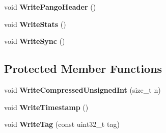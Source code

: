 \begin{DoxyCompactItemize}
\item 
void {\bfseries Write\+Pango\+Header} ()\hypertarget{classpangolin_1_1_packet_stream_writer_a98769a090eb605689cc88e6a5c3052c2}{}\label{classpangolin_1_1_packet_stream_writer_a98769a090eb605689cc88e6a5c3052c2}

\item 
void {\bfseries Write\+Stats} ()\hypertarget{classpangolin_1_1_packet_stream_writer_a8e66e558ba56dbec5f20aee019f25a7a}{}\label{classpangolin_1_1_packet_stream_writer_a8e66e558ba56dbec5f20aee019f25a7a}

\item 
void {\bfseries Write\+Sync} ()\hypertarget{classpangolin_1_1_packet_stream_writer_ab41e3271bd3b5ca136cdff5477439740}{}\label{classpangolin_1_1_packet_stream_writer_ab41e3271bd3b5ca136cdff5477439740}

\end{DoxyCompactItemize}
\subsection*{Protected Member Functions}
\begin{DoxyCompactItemize}
\item 
void {\bfseries Write\+Compressed\+Unsigned\+Int} (size\+\_\+t n)\hypertarget{classpangolin_1_1_packet_stream_writer_accf4896829d689b05f8cd374c99c67cb}{}\label{classpangolin_1_1_packet_stream_writer_accf4896829d689b05f8cd374c99c67cb}

\item 
void {\bfseries Write\+Timestamp} ()\hypertarget{classpangolin_1_1_packet_stream_writer_a37862edcb8b743f50949ba50ca286b50}{}\label{classpangolin_1_1_packet_stream_writer_a37862edcb8b743f50949ba50ca286b50}

\item 
void {\bfseries Write\+Tag} (const uint32\+\_\+t tag)\hypertarget{classpangolin_1_1_packet_stream_writer_a73a33d797e6c03ff26032f8ab3e4d238}{}\label{classpangolin_1_1_packet_stream_writer_a73a33d797e6c03ff26032f8ab3e4d238}

\end{DoxyCompactItemize}
